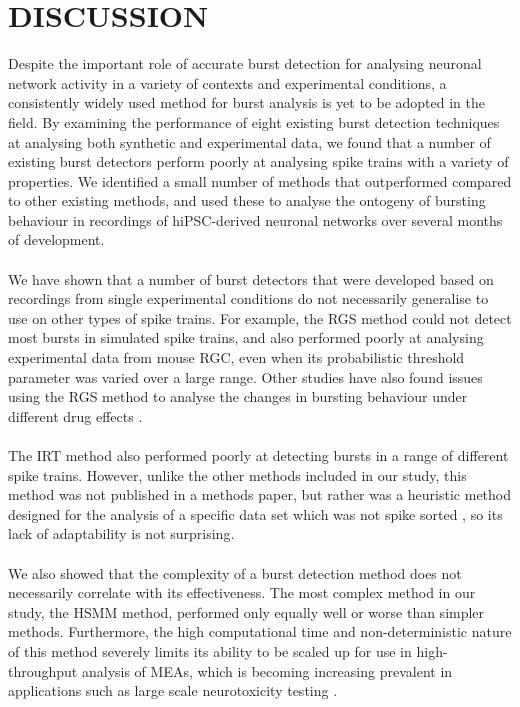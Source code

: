 \documentclass[12pt, titlepage]{article}
\begin{document}
\section*{DISCUSSION}
Despite the important role of accurate burst detection for analysing neuronal network activity in a variety of contexts and experimental conditions, a consistently widely used method for burst analysis is yet to be adopted in the field. By examining the performance of eight existing burst detection techniques at analysing both synthetic and experimental data, we found that a number of existing burst detectors perform poorly at analysing spike trains with a variety of properties. We identified a small number of methods that outperformed compared to other existing methods, and used these to analyse the ontogeny of bursting behaviour in recordings of hiPSC-derived neuronal networks over several months of development.
\\ \\We have shown that a number of burst detectors that were developed based on recordings from single experimental conditions do not necessarily generalise to use on other types of spike trains. For example, the RGS method could not detect most bursts in simulated spike trains, and also performed poorly at analysing experimental data from mouse RGC, even when its probabilistic threshold parameter was varied over a large range. Other studies have also found issues using the RGS method to analyse the changes in bursting behaviour under different drug effects \cite{Eisenman2015}. 
\\ \\The IRT method also performed poorly at detecting bursts in a range of different spike trains. However, unlike the other methods included in our study, this method was not published in a methods paper, but rather was a heuristic method designed for the analysis of a specific data set which was not spike sorted \cite{Hennig2011}, so its lack of adaptability is not surprising.
\\ \\We also showed that the complexity of a burst detection method does not necessarily correlate with its effectiveness. The most complex method in our study, the HSMM method, performed only equally well or worse than simpler methods. Furthermore, the high computational time and non-deterministic nature of this method severely limits its ability to be scaled up for use in high-throughput analysis of MEAs, which is becoming increasing prevalent in applications such as large scale neurotoxicity testing \cite{Breier2008}.
\end{document}
